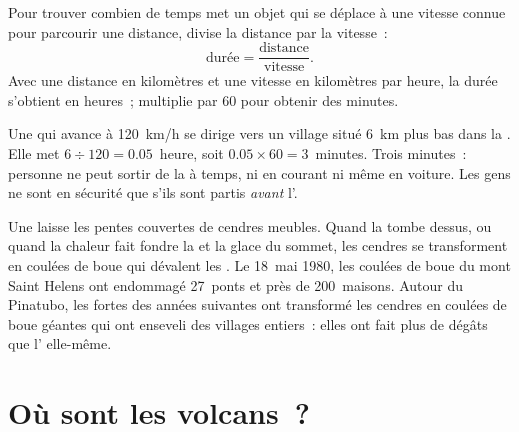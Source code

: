 \begin{method}\label{met:g7:volcanoes:time}
Pour trouver combien de temps met un objet qui se déplace à une vitesse
connue pour parcourir une distance, divise la distance par la vitesse~:
\[
\text{durée} = \frac{\text{distance}}{\text{vitesse}}.
\]
Avec une distance en kilomètres et une vitesse en kilomètres par heure, la
durée s'obtient en heures~; multiplie par 60 pour obtenir des minutes.
\end{method}

\begin{example}\label{ex:g7:volcanoes:race}
Une  qui avance à \qty{120}{km/h} se dirige vers un
village situé \qty{6}{km} plus bas dans la . Elle met
$6 \div 120 = 0.05$~heure, soit $0.05 \times 60 = 3$~minutes. Trois
minutes~: personne ne peut sortir de la  à temps, ni en courant ni
même en voiture. Les gens ne sont en sécurité que s'ils sont partis
\emph{avant} l'.
\end{example}

\begin{remark}\label{rem:g7:volcanoes:mudflows}
Une  laisse les pentes couvertes de cendres meubles. Quand la 
tombe dessus, ou quand la chaleur fait fondre la  et la glace du
sommet, les cendres se transforment en coulées de boue qui dévalent les
. Le 18~mai 1980, les coulées de boue du mont Saint Helens ont
endommagé 27~ponts et près de 200~maisons. Autour du Pinatubo, les fortes
 des années suivantes ont transformé les cendres en coulées de boue
géantes qui ont enseveli des villages entiers~: elles ont fait plus de
dégâts que l' elle-même.
\end{remark}


\section{Où sont les volcans~?}

